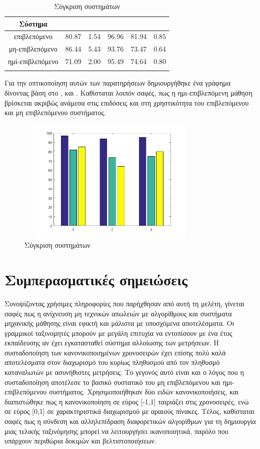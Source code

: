 \begin{center}
\begin{longtabu}  to 0.8\textwidth { | c || c | c | c | c | c |  }
 \hline
Σύστημα &   &  &  &  &   \\
 \hline
επιβλεπόμενο & 80.87 & 1.54 & 96.96 & 81.94 & 0.85 \\
μη-επιβλεπόμενο & 86.44	& 5.43 & 93.76 & 73.47 & 0.64\\
ημί-επιβλεπόμενο & 71.09 & 2.00 & 95.49 & 74.64 & 0.80\\
\hline
\caption{Σύγκριση συστημάτων}
\label{tab:comparesystems}
\end{longtabu}
\end{center}

Για την οπτικοποίηση αυτών των παρατηρήσεων δημιουργήθηκε ένα γράφημα δίνοντας βάση στο ,  και . Καθίσταται λοιπόν σαφές, πως η ημι-επιβλεπόμενη μάθηση βρίσκεται ακριβώς ανάμεσα στις επιδόσεις και στη χρηστικότητα του επιβλεπόμενου και μη επιβλεπόμενου συστήματος.

\begin{figure}[ht!]
\centering
 \includegraphics[width=90mm, height=60mm]{../../plots/comparison_systems.png}
 \caption{Σύγκριση συστημάτων}
\label{fig:comparisonsystem}
 \end{figure}
\section{Συμπερασματικές σημειώσεις}
Συνοψίζοντας χρήσιμες πληροφορίες που παρήχθησαν από αυτή τη μελέτη, γίνεται σαφές πως η ανίχνευση μη τεχνικών απωλειών με αλγορίθμους και συστήματα μηχανικής μάθησης είναι εφικτή και μάλιστα με υποσχόμενα αποτελέσματα. Οι γραμμικοί ταξινομητές μπορούν με μεγάλη επιτυχία να εντοπίσουν με ένα έτος εκπαίδευσης αν έχει εγκατασταθεί σύστημα αλλοίωσης των μετρήσεων. Η συσταδοποίηση των κανονικοποιημένων χρονοσειρών έχει επίσης πολύ καλά αποτελέσματα στον διαχωρισμό του κυρίως πληθυσμού από τον πληθυσμό καταναλωτών με ασυνήθιστες μετρήσεις. Το γεγονός αυτό είναι και ο λόγος που η συσταδοποίηση αποτέλεσε το βασικό συστατικό του μη επιβλεπόμενου και ημι-επιβλεπόμενου συστήματος. Χρησιμοποιήθηκαν δύο ειδών κανονικοποιήσεις, και διαπιστώθηκε πως η κανονικοποίηση σε εύρος [-1,1] ταιριάζει στις χρονοσειρές, ενώ σε εύρος [0,1] σε χαρακτηριστικά διαχωρισμού  με αραιούς πίνακες. Τέλος, καθίσταται σαφές πως η σύνδεση και αλληλεπίδραση διαφορετικών αλγορίθμων για τη δημιουργία μιας τελικής ταξινόμησης μπορεί να λειτουργήσει ικανοποιητικά, παρόλο που υπάρχουν περιθώρια δοκιμών και βελτιστοποιήσεων.
